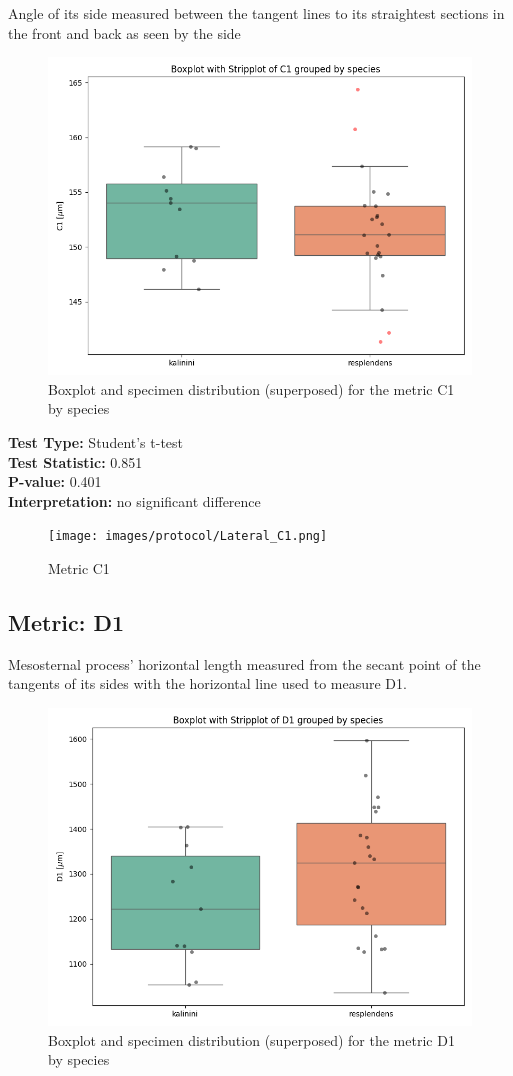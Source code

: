 Angle of its side measured between the tangent lines to its straightest sections in the front and back as seen by the side

\begin{figure}[H]
\centering
\includegraphics[width=0.7\linewidth]{images/boxplot/boxplot_C1.png}
\caption{  Boxplot and specimen distribution (superposed) for the metric  C1 by species}
\end{figure}

\noindent\textbf{Test Type:} Student's t-test \\
\noindent\textbf{Test Statistic:} 0.851 \\
\noindent\textbf{P-value:} 0.401 \\
\noindent\textbf{Interpretation:} no significant difference

\begin{figure}[H]
\centering
\texttt{[image: images/protocol/Lateral\_C1.png]}
\caption{ Metric C1}
\end{figure}

\newpage
\subsection*{Metric: D1}

Mesosternal process’ horizontal length measured from the secant point of the tangents of its sides with the horizontal line used to measure D1. 

\begin{figure}[H]
\centering
\includegraphics[width=0.7\linewidth]{images/boxplot/boxplot_D1.png}
\caption{  Boxplot and specimen distribution (superposed) for the metric  D1 by species}
\end{figure}

